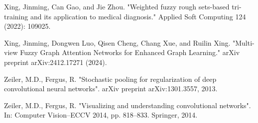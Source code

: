 \documentclass{article}
\begin{document}
\begin{thebibliography}{99}
 Xing, Jinming, Can Gao, and Jie Zhou. "Weighted fuzzy rough sets-based tri-training and its application to medical diagnosis." Applied Soft Computing 124 (2022): 109025.

 Xing, Jinming, Dongwen Luo, Qisen Cheng, Chang Xue, and Ruilin Xing. "Multi-view Fuzzy Graph Attention Networks for Enhanced Graph Learning." arXiv preprint arXiv:2412.17271 (2024).

 Zeiler, M.D., Fergus, R. "Stochastic pooling for regularization of deep convolutional neural networks". arXiv preprint arXiv:1301.3557, 2013.

 Zeiler, M.D., Fergus, R. "Visualizing and understanding convolutional networks". In: Computer Vision–ECCV 2014, pp. 818–833. Springer, 2014.
\end{thebibliography}
\end{document}
